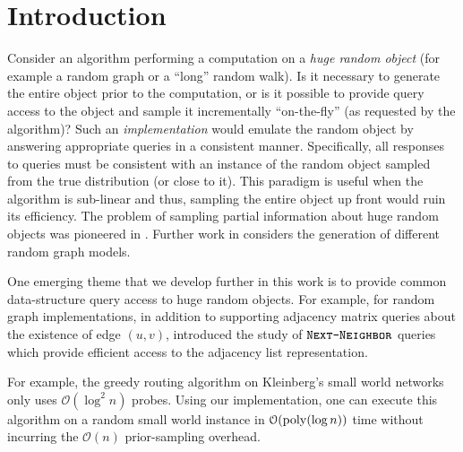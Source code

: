 \section{Introduction}
Consider an algorithm performing a computation on a \emph{huge random object} (for example a random graph or a ``long'' random walk).
Is it necessary to generate the entire object prior to the computation,
or is it possible to provide query access to the object and sample it incrementally ``on-the-fly'' (as requested by the algorithm)?
Such an \emph{implementation} would emulate the random object by answering appropriate queries in a consistent manner.
Specifically, all responses to queries must be consistent with an instance of the random object sampled from the true distribution (or close to it).
This paradigm is useful when the algorithm is sub-linear and thus, sampling the entire object up front would ruin its efficiency.
The problem of sampling partial information about huge random objects was pioneered in \cite{huge_old,huge}.
Further work in \cite{sparse,reut} considers the generation of different random graph models.

One emerging theme that we develop further in this work is to provide common data-structure query access to huge random objects.
For example, for random graph implementations, in addition to supporting adjacency matrix queries about the existence of edge $(u,v)$,
\cite{reut} introduced the study of $\texttt{\textsc{Next-Neighbor}}$ queries which provide efficient access to the adjacency list representation.

For example, the greedy routing algorithm on Kleinberg's small world networks \cite{kleinberg} only uses $\mathcal O(\log^2 n)$ probes.
Using our implementation, one can execute this algorithm on a random small world instance
in $\mathcal O(\mathrm{poly}(\log n))$ time without incurring the $\mathcal O(n)$ prior-sampling overhead.




